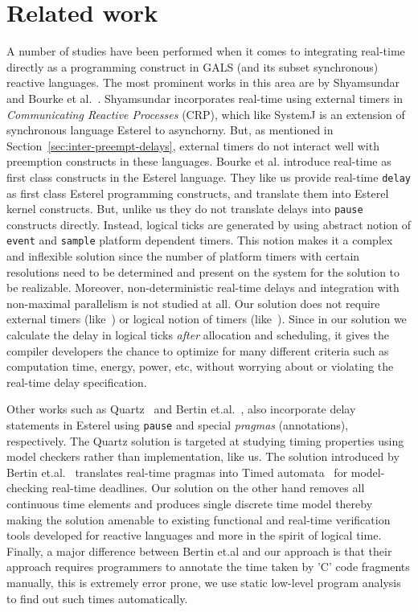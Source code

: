 \section{Related work}
\label{sec:related-work}


A number of studies have been performed when it comes to integrating
real-time directly as a programming construct in GALS (and its subset
synchronous) reactive languages. The most prominent works in this area
are by Shyamsundar~\cite{rsh94} and Bourke et
al.~\cite{Bourke2009a}. Shyamsundar incorporates real-time using
external timers in \textit{Communicating Reactive Processes} (CRP),
which like SystemJ is an extension of synchronous language Esterel to
asynchorny. But, as mentioned in Section~\ref{sec:inter-preempt-delays},
external timers do not interact well with preemption constructs in these
languages. Bourke et al. introduce real-time as first class constructs
in the Esterel language. They like us provide real-time \texttt{delay}
as first class Esterel programming constructs, and translate them into
Esterel kernel constructs. But, unlike us they do not translate delays
into \texttt{pause} constructs directly. Instead, logical ticks are
generated by using abstract notion of \texttt{event} and \texttt{sample}
platform dependent timers. This notion makes it a complex and inflexible
solution since the number of platform timers with certain resolutions
need to be determined and present on the system for the solution to be
realizable. Moreover, non-deterministic real-time delays and integration
with non-maximal parallelism is not studied at all. Our solution does
not require external timers (like~\cite{rsh94}) or logical notion of
timers (like~\cite{Bourke2009a}). Since in our solution we calculate the
delay in logical ticks \textit{after} allocation and scheduling, it
gives the compiler developers the chance to optimize for many different
criteria such as computation time, energy, power, etc, without worrying
about or violating the real-time delay specification. 

Other works such as Quartz~\cite{glog02} and Bertin
et.al.~\cite{Bertin:2000:TVR:1947412.1947439}, also incorporate delay
statements in Esterel using \texttt{pause} and special \textit{pragmas}
(annotations), respectively.  The Quartz solution is targeted at
studying timing properties using model checkers rather than
implementation, like us. The solution introduced by Bertin
et.al.~\cite{Bertin:2000:TVR:1947412.1947439} translates real-time
pragmas into Timed automata~\cite{alur94} for model-checking real-time
deadlines. Our solution on the other hand removes all continuous time
elements and produces single discrete time model thereby making the
solution amenable to existing functional and real-time verification
tools developed for reactive languages and more in the spirit of logical
time. Finally, a major difference between Bertin et.al and our approach
is that their approach requires programmers to annotate the time taken
by 'C' code fragments manually, this is extremely error prone, we use
static low-level program analysis to find out such times automatically.




